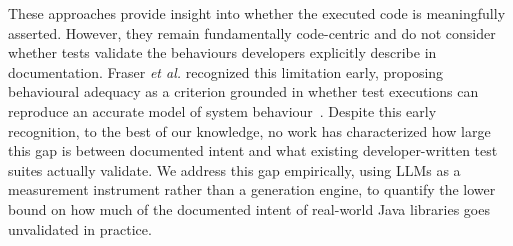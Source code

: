 These approaches provide insight into whether the executed code is meaningfully asserted. However, they remain fundamentally code-centric and do not consider whether tests validate the behaviours developers explicitly describe in documentation. Fraser \textit{et al.} 
recognized this limitation early, proposing behavioural adequacy as a criterion grounded in whether test executions can reproduce an accurate model of system behaviour~\cite{10.1109/ICST.2012.110}. 
Despite this early recognition, to the best of our knowledge, no work has characterized how large this gap is between documented intent and what existing developer-written test suites actually validate. We address this gap empirically, using LLMs as a measurement instrument rather than a generation engine, to quantify the lower bound on how much of the documented intent of real-world Java libraries goes unvalidated in practice.




